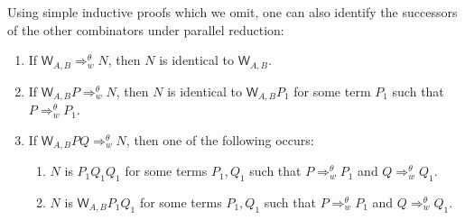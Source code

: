 \documentclass{lmcs} %
\newcommand{\param}{\theta}
\newcommand{\Reduces}[2]{\Rightarrow_{#1}^{#2}}
\newcommand{\ctW}[4]{{\mathsf W}_{#1, #2}#3#4}
\begin{document}
Using simple inductive proofs which we omit, one can also identify the successors of the other combinators under parallel reduction:
\begin{prop}\label{prop:stunted}\hfill
\begin{enumerate}[leftmargin=*]
    \item\label{prop:stunted:1} If $\ctW{A}{B}{}{} \Reduces{w}{\param} N$, then $N$ is identical to $\ctW{A}{B}{}{}$.
    \item\label{prop:stunted:2} If $\ctW{A}{B}{P}{} \Reduces{w}{\param} N$, then $N$ is identical to $\ctW{A}{B}{P_1}{}$ for some term $P_1$ such that $P\Reduces{w}{\param} P_1$.
    \item \label{prop:stunted:3} If $\ctW{A}{B}{P}{Q}\Reduces{w}{\param} N$, then one of the following occurs:
\begin{enumerate}[leftmargin=*, label=(\alph*), ref=\alph*]
    \item \label{eqn:rmk:twosucc1} $N$ is $P_1Q_1Q_1$ for some  terms $P_1,Q_1$ such that $P\Reduces{w}{\param} P_1$ and $Q\Reduces{w}{\param} Q_1$. 
    \item \label{eqn:rmk:twosucc2} $N$ is $\ctW{A}{B}{P_1}{Q_1}$ for some terms $P_1,Q_1$ such that $P\Reduces{w}{\param} P_1$ and $Q\Reduces{w}{\param} Q_1$. 
\end{enumerate}   
\end{enumerate}
\end{prop}
\end{document}
